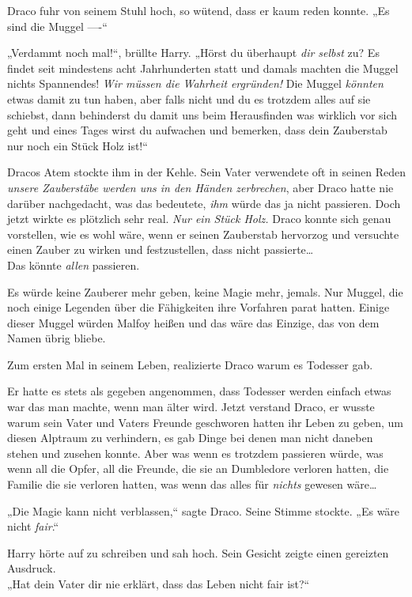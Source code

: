 {Draco fuhr von seinem Stuhl hoch, so wütend, dass er kaum reden konnte. „Es sind die Muggel ----“

„Verdammt noch mal!“, brüllte Harry. „Hörst du überhaupt \emph{dir selbst} zu? Es findet seit mindestens acht Jahrhunderten statt und damals machten die Muggel nichts Spannendes! \emph{Wir müssen die Wahrheit} \emph{ergründen!} Die Muggel \emph{könnten} etwas damit zu tun haben, aber falls nicht und du es trotzdem alles auf sie schiebst, dann behinderst du damit uns beim Herausfinden was wirklich vor sich geht und eines Tages wirst du aufwachen und bemerken, dass dein Zauberstab nur noch ein Stück Holz ist!“

Dracos Atem stockte ihm in der Kehle. Sein Vater verwendete oft in seinen Reden \emph{unsere Zauberstäbe werden uns in den Händen zerbrechen}, aber Draco hatte nie darüber nachgedacht, was das bedeutete, \emph{ihm} würde das ja nicht passieren. Doch jetzt wirkte es plötzlich sehr real. \emph{Nur ein Stück Holz.} Draco konnte sich genau vorstellen, wie es wohl wäre, wenn er seinen Zauberstab hervorzog und versuchte einen Zauber zu wirken und festzustellen, dass nicht passierte…\\ Das könnte \emph{allen} passieren.

Es würde keine Zauberer mehr geben, keine Magie mehr, jemals. Nur Muggel, die noch einige Legenden über die Fähigkeiten ihre Vorfahren parat hatten. Einige dieser Muggel würden Malfoy heißen und das wäre das Einzige, das von dem Namen übrig bliebe.

Zum ersten Mal in seinem Leben, realizierte Draco warum es Todesser gab.

Er hatte es stets als gegeben angenommen, dass Todesser werden einfach etwas war das man machte, wenn man älter wird. Jetzt verstand Draco, er wusste warum sein Vater und Vaters Freunde geschworen hatten ihr Leben zu geben, um diesen Alptraum zu verhindern, es gab Dinge bei denen man nicht daneben stehen und zusehen konnte. Aber was wenn es trotzdem passieren würde, was wenn all die Opfer, all die Freunde, die sie an Dumbledore verloren hatten, die Familie die sie verloren hatten, was wenn das alles für \emph{nichts} gewesen wäre…

„Die Magie kann nicht verblassen,“ sagte Draco. Seine Stimme stockte. „Es wäre nicht \emph{fair}.“

Harry hörte auf zu schreiben und sah hoch. Sein Gesicht zeigte einen gereizten Ausdruck.\\ „Hat dein Vater dir nie erklärt, dass das Leben nicht fair ist?“

}
